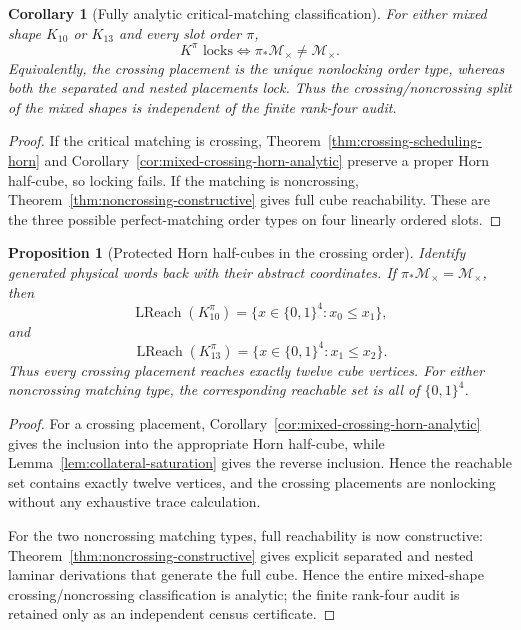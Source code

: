 \documentclass[11pt]{article}
\newtheorem{proposition}[definition]{Proposition}
\newtheorem{corollary}[definition]{Corollary}
\begin{document}
\begin{corollary}[Fully analytic critical-matching classification]
\label{cor:critical-matching-analytic}
For either mixed shape $K_{10}$ or $K_{13}$ and every slot order $\pi$,
\[
  \boxed{
  K^{\pi}\text{ locks}
  \iff
  \pi_*\mathcal M_{\times}\ne\mathcal M_{\times}.
  }
\]
Equivalently, the crossing placement is the unique nonlocking order type,
whereas both the separated and nested placements lock.  Thus the
crossing/noncrossing split of the mixed shapes is independent of the finite
rank-four audit.
\end{corollary}

\begin{proof}
If the critical matching is crossing,
Theorem~\ref{thm:crossing-scheduling-horn} and
Corollary~\ref{cor:mixed-crossing-horn-analytic} preserve a proper Horn
half-cube, so locking fails.  If the matching is noncrossing,
Theorem~\ref{thm:noncrossing-constructive} gives full cube reachability.
These are the three possible perfect-matching order types on four linearly
ordered slots.
\end{proof}

\begin{proposition}[Protected Horn half-cubes in the crossing order]
\label{prop:protected-horn-halfcubes}
Identify generated physical words back with their abstract coordinates.  If
$\pi_*\mathcal M_{\times}=\mathcal M_{\times}$, then
\[
 \boxed{
  \operatorname{LReach}(K_{10}^{\pi})
  =\{x\in\{0,1\}^4:x_0\le x_1\},
 }
\]
and
\[
 \boxed{
  \operatorname{LReach}(K_{13}^{\pi})
  =\{x\in\{0,1\}^4:x_1\le x_2\}.
 }
\]
Thus every crossing placement reaches exactly twelve cube vertices.  For either
noncrossing matching type, the corresponding reachable set is all of
$\{0,1\}^4$.
\end{proposition}

\begin{proof}
For a crossing placement, Corollary~\ref{cor:mixed-crossing-horn-analytic}
gives the inclusion into the appropriate Horn half-cube, while
Lemma~\ref{lem:collateral-saturation} gives the reverse inclusion.  Hence the
reachable set contains exactly twelve vertices, and the crossing placements
are nonlocking without any exhaustive trace calculation.

For the two noncrossing matching types, full reachability is now constructive:
Theorem~\ref{thm:noncrossing-constructive} gives explicit separated and nested
laminar derivations that generate the full cube.  Hence the entire mixed-shape
crossing/noncrossing classification is analytic; the finite rank-four audit is
retained only as an independent census certificate.
\end{proof}
\end{document}
